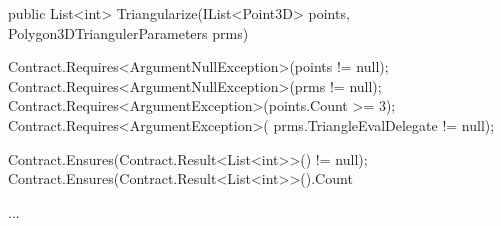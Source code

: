 \begin{Csharp}[label=cs:contracts,caption={Example of code contracts in the \emph{Triangularize} method of the \emph{Polygon3DTrianguler} class.}]
public List<int> Triangularize(IList<Point3D> points,
		Polygon3DTriangulerParameters prms) {
		
	Contract.Requires<ArgumentNullException>(points != null);
	Contract.Requires<ArgumentNullException>(prms != null);
	Contract.Requires<ArgumentException>(points.Count >= 3);
	Contract.Requires<ArgumentException>(
		prms.TriangleEvalDelegate != null);
		
	Contract.Ensures(Contract.Result<List<int>>() != null);
	Contract.Ensures(Contract.Result<List<int>>().Count %

	...	
}
\end{Csharp}
































